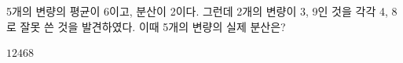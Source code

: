 5개의 변량의 평균이 6이고, 분산이 2이다. 그런데 2개의 변량이 3, 9인 것을 각각 4, 8로 잘못 쓴 것을 발견하였다. 이때 5개의 변량의 실제 분산은?
\begin{choices32}{$1$}{$2$}{$4$}{$6$}{$8$}\end{choices32}
